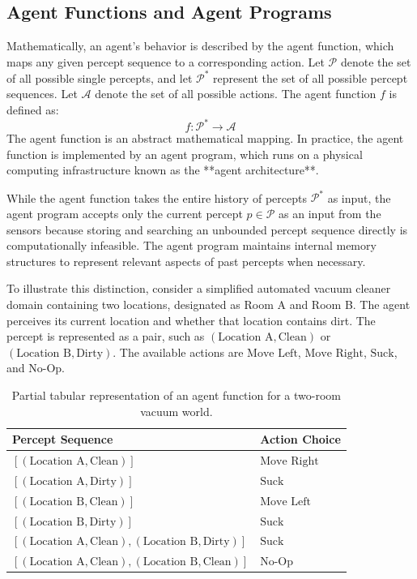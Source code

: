 \documentclass[12pt]{report}
\begin{document}
\subsection{Agent Functions and Agent Programs}

Mathematically, an agent's behavior is described by the agent function, which maps any given percept sequence to a corresponding action. Let $\mathcal{P}$ denote the set of all possible single percepts, and let $\mathcal{P}^*$ represent the set of all possible percept sequences. Let $\mathcal{A}$ denote the set of all possible actions. The agent function $f$ is defined as:
\begin{equation}
f: \mathcal{P}^* \to \mathcal{A}
\end{equation}
The agent function is an abstract mathematical mapping. In practice, the agent function is implemented by an agent program, which runs on a physical computing infrastructure known as the **agent architecture**. 

While the agent function takes the entire history of percepts $\mathcal{P}^*$ as input, the agent program accepts only the current percept $p \in \mathcal{P}$ as an input from the sensors because storing and searching an unbounded percept sequence directly is computationally infeasible. The agent program maintains internal memory structures to represent relevant aspects of past percepts when necessary.

To illustrate this distinction, consider a simplified automated vacuum cleaner domain containing two locations, designated as Room A and Room B. The agent perceives its current location and whether that location contains dirt. The percept is represented as a pair, such as $(\text{Location A}, \text{Clean})$ or $(\text{Location B}, \text{Dirty})$. The available actions are $\text{Move Left}$, $\text{Move Right}$, $\text{Suck}$, and $\text{No-Op}$.

\begin{table}[htbp]
\centering
\small
\begin{tabularx}{\textwidth}{@{} X X @{}}
\toprule
\textbf{Percept Sequence} & \textbf{Action Choice} \\
\midrule
$[(\text{Location A}, \text{Clean})]$ & $\text{Move Right}$ \\
$[(\text{Location A}, \text{Dirty})]$ & $\text{Suck}$ \\
$[(\text{Location B}, \text{Clean})]$ & $\text{Move Left}$ \\
$[(\text{Location B}, \text{Dirty})]$ & $\text{Suck}$ \\
$[(\text{Location A}, \text{Clean}), (\text{Location B}, \text{Dirty})]$ & $\text{Suck}$ \\
$[(\text{Location A}, \text{Clean}), (\text{Location B}, \text{Clean})]$ & $\text{No-Op}$ \\
\bottomrule
\end{tabularx}
\caption{Partial tabular representation of an agent function for a two-room vacuum world.}
\label{tab:vacuum_agent_function}
\end{table}
\end{document}
